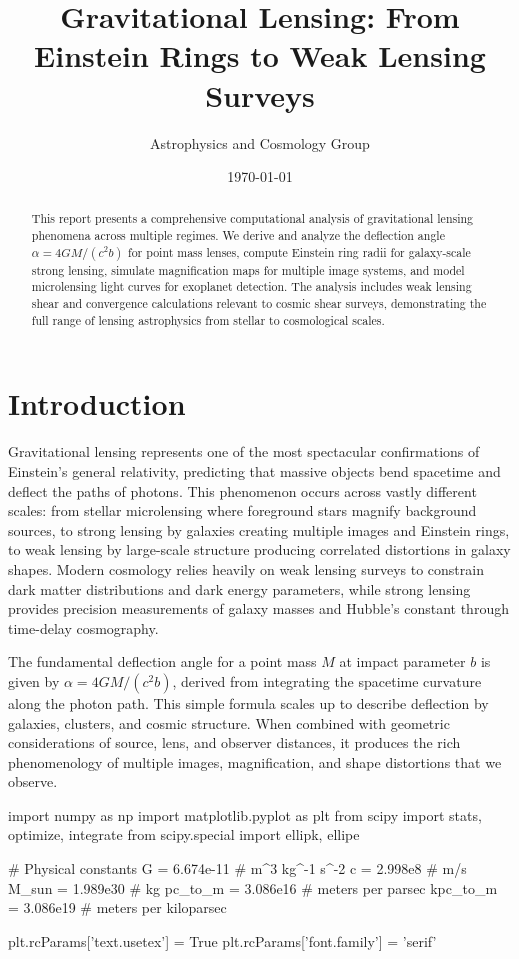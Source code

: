 \documentclass[11pt,a4paper]{article}
\title{Gravitational Lensing: From Einstein Rings to Weak Lensing Surveys}
\author{Astrophysics and Cosmology Group}
\date{\today}
\begin{document}
\maketitle

\begin{abstract}
This report presents a comprehensive computational analysis of gravitational lensing phenomena
across multiple regimes. We derive and analyze the deflection angle $\alpha = 4GM/(c^2b)$ for
point mass lenses, compute Einstein ring radii for galaxy-scale strong lensing, simulate
magnification maps for multiple image systems, and model microlensing light curves for
exoplanet detection. The analysis includes weak lensing shear and convergence calculations
relevant to cosmic shear surveys, demonstrating the full range of lensing astrophysics from
stellar to cosmological scales.
\end{abstract}

\section{Introduction}

Gravitational lensing represents one of the most spectacular confirmations of Einstein's
general relativity, predicting that massive objects bend spacetime and deflect the paths
of photons. This phenomenon occurs across vastly different scales: from stellar microlensing
where foreground stars magnify background sources, to strong lensing by galaxies creating
multiple images and Einstein rings, to weak lensing by large-scale structure producing
correlated distortions in galaxy shapes. Modern cosmology relies heavily on weak lensing
surveys to constrain dark matter distributions and dark energy parameters, while strong
lensing provides precision measurements of galaxy masses and Hubble's constant through
time-delay cosmography.

The fundamental deflection angle for a point mass $M$ at impact parameter $b$ is given by
$\alpha = 4GM/(c^2 b)$, derived from integrating the spacetime curvature along the photon path.
This simple formula scales up to describe deflection by galaxies, clusters, and cosmic structure.
When combined with geometric considerations of source, lens, and observer distances, it produces
the rich phenomenology of multiple images, magnification, and shape distortions that we observe.

\begin{pycode}

import numpy as np
import matplotlib.pyplot as plt
from scipy import stats, optimize, integrate
from scipy.special import ellipk, ellipe

# Physical constants
G = 6.674e-11  # m^3 kg^-1 s^-2
c = 2.998e8    # m/s
M_sun = 1.989e30  # kg
pc_to_m = 3.086e16  # meters per parsec
kpc_to_m = 3.086e19  # meters per kiloparsec

plt.rcParams['text.usetex'] = True
plt.rcParams['font.family'] = 'serif'

\end{pycode}
\end{document}
